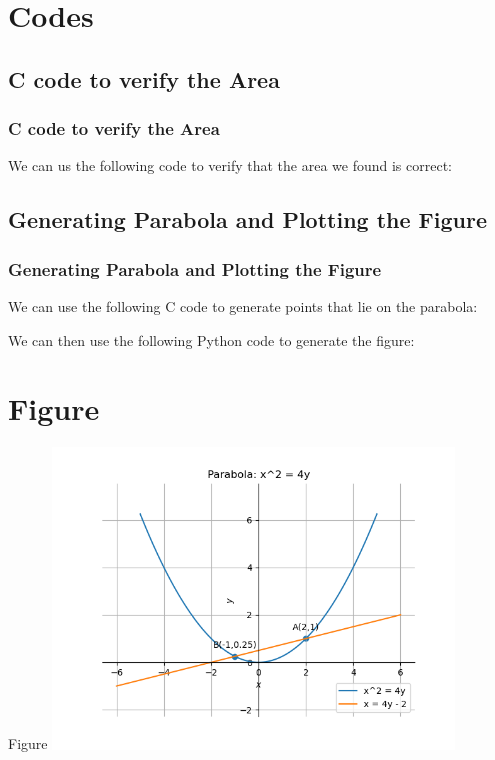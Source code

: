 \documentclass{beamer}
\theoremstyle{remark}
\numberwithin{equation}{section}
\begin{document}
\section{Codes}
\subsection{C code to verify the Area}
\begin{frame}[fragile]
\frametitle{C code to verify the Area}
We can us the following code to verify that the area we found is correct:

\end{frame}

\subsection{Generating Parabola and Plotting the Figure}
\begin{frame}[Fragile]
\frametitle{Generating Parabola and Plotting the Figure}
    We can use the following C code to generate points that lie on the parabola:


    We can then use the following Python code to generate the figure:
    

\end{frame}

\section{Figure}
\begin{frame}{Figure}
\includegraphics[width=0.8\textwidth]{figs/plot.png}
\end{frame}
\end{document}
